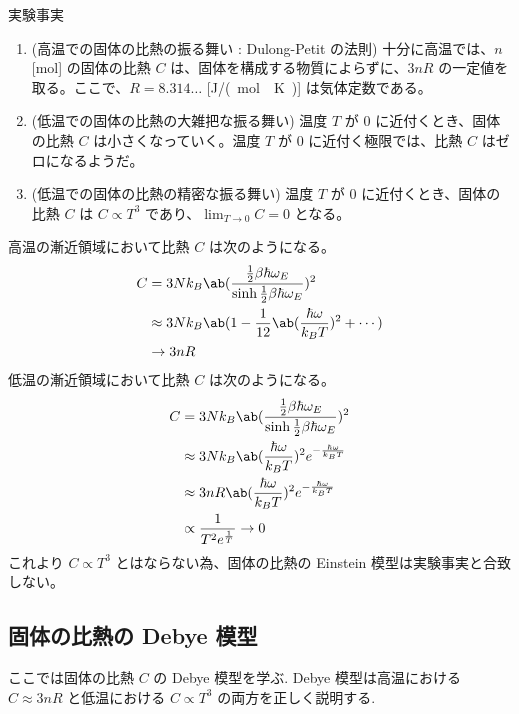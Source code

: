 \documentclass[uplatex,diffipdfmx,a4paper,11pt]{jlreq}
\numberwithin{equation}{section}
\theoremstyle{definition}
\begin{document}
\begin{itembox}[l]{実験事実}
  \begin{enumerate}
    \item (高温での固体の比熱の振る舞い : Dulong-Petit の法則) 十分に高温では、$n$ [\si{mol}] の固体の比熱 $C$ は、固体を構成する物質によらずに、$3nR$ の一定値を取る。ここで、$R = 8.314\ldots$ [\si{J/(mol\cdot K)}] は気体定数である。
    \item (低温での固体の比熱の大雑把な振る舞い) 温度 $T$ が $0$ に近付くとき、固体の比熱 $C$ は小さくなっていく。温度 $T$ が $0$ に近付く極限では、比熱 $C$ はゼロになるようだ。
    \item (低温での固体の比熱の精密な振る舞い) 温度 $T$ が $0$ に近付くとき、固体の比熱 $C$ は $C \propto T^3$ であり、$\lim_{T\to 0} C = 0$ となる。
  \end{enumerate}
\end{itembox}
高温の漸近領域において比熱 $C$ は次のようになる。
\begin{align}
  C & = 3Nk_B\ab(\frac{\frac{1}{2}\beta\hbar\omega_E}{\sinh\frac{1}{2}\beta\hbar\omega_E})^2 \\
    & \approx 3Nk_B\ab(1 - \frac{1}{12}\ab(\frac{\hbar\omega}{k_BT})^2 + \cdots)             \\
    & \to 3nR
\end{align}
低温の漸近領域において比熱 $C$ は次のようになる。
\begin{align}
  C & = 3Nk_B\ab(\frac{\frac{1}{2}\beta\hbar\omega_E}{\sinh\frac{1}{2}\beta\hbar\omega_E})^2 \\
    & \approx 3Nk_B\ab(\frac{\hbar\omega}{k_BT})^2e^{-\frac{\hbar\omega}{k_BT}}              \\
    & \approx 3nR\ab(\frac{\hbar\omega}{k_BT})^2e^{-\frac{\hbar\omega}{k_BT}}                \\
    & \propto \frac{1}{T^{2}e^{\frac{1}{T}}} \to 0
\end{align}
これより $C \propto T^3$ とはならない為、固体の比熱の Einstein 模型は実験事実と合致しない。

\subsection{固体の比熱の Debye 模型}
ここでは固体の比熱 $C$ の Debye 模型を学ぶ. Debye 模型は高温における $C\approx 3nR$ と低温における $C\propto T^3$ の両方を正しく説明する.
\end{document}
